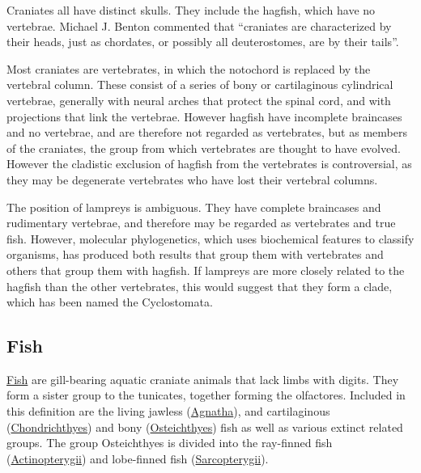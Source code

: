 Craniates all have distinct skulls. They include the hagfish, which have no vertebrae. Michael J. Benton commented that ``craniates are characterized by their heads, just as chordates, or possibly all deuterostomes, are by their tails''.

Most craniates are vertebrates, in which the notochord is replaced by the vertebral column. These consist of a series of bony or cartilaginous cylindrical vertebrae, generally with neural arches that protect the spinal cord, and with projections that link the vertebrae. However hagfish have incomplete braincases and no vertebrae, and are therefore not regarded as vertebrates, but as members of the craniates, the group from which vertebrates are thought to have evolved. However the cladistic exclusion of hagfish from the vertebrates is controversial, as they may be degenerate vertebrates who have lost their vertebral columns.

The position of lampreys is ambiguous. They have complete braincases and rudimentary vertebrae, and therefore may be regarded as vertebrates and true fish. However, molecular phylogenetics, which uses biochemical features to classify organisms, has produced both results that group them with vertebrates and others that group them with hagfish. If lampreys are more closely related to the hagfish than the other vertebrates, this would suggest that they form a clade, which has been named the Cyclostomata.

\hypertarget{fish}{%
\subsection{Fish}\label{fish}}

\href{https://en.wikipedia.org/wiki/Fish}{Fish} are gill-bearing aquatic craniate animals that lack limbs with digits. They form a sister group to the tunicates, together forming the olfactores. Included in this definition are the living jawless (\href{https://en.wikipedia.org/wiki/Agnatha}{Agnatha}), and cartilaginous (\href{https://en.wikipedia.org/wiki/Chondrichthyes}{Chondrichthyes}) and bony (\href{https://en.wikipedia.org/wiki/Osteichthyes}{Osteichthyes}) fish as well as various extinct related groups. The group Osteichthyes is divided into the ray-finned fish (\href{https://en.wikipedia.org/wiki/Actinopterygii}{Actinopterygii}) and lobe-finned fish (\href{https://en.wikipedia.org/wiki/Sarcopterygii}{Sarcopterygii}).



